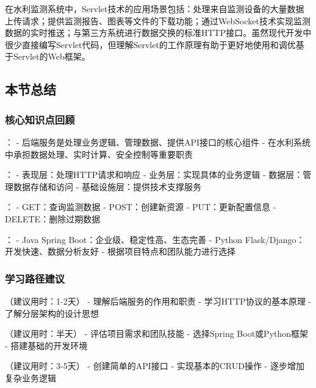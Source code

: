 在水利监测系统中，Servlet技术的应用场景包括：处理来自监测设备的大量数据上传请求；提供监测报告、图表等文件的下载功能；通过WebSocket技术实现监测数据的实时推送；与第三方系统进行数据交换的标准HTTP接口。虽然现代开发中很少直接编写Servlet代码，但理解Servlet的工作原理有助于更好地使用和调优基于Servlet的Web框架。

\hypertarget{ux672cux8282ux603bux7ed3}{%
\subsection{本节总结}\label{ux672cux8282ux603bux7ed3}}

\hypertarget{ux6838ux5fc3ux77e5ux8bc6ux70b9ux56deux987e}{%
\subsubsection{核心知识点回顾}\label{ux6838ux5fc3ux77e5ux8bc6ux70b9ux56deux987e}}

： - 后端服务是处理业务逻辑、管理数据、提供API接口的核心组件 - 在水利系统中承担数据处理、实时计算、安全控制等重要职责

： - 表现层：处理HTTP请求和响应 - 业务层：实现具体的业务逻辑 - 数据层：管理数据存储和访问 - 基础设施层：提供技术支撑服务

： - GET：查询监测数据 - POST：创建新资源 - PUT：更新配置信息 - DELETE：删除过期数据

： - Java Spring Boot：企业级、稳定性高、生态完善 - Python Flask/Django：开发快速、数据分析友好 - 根据项目特点和团队能力进行选择

\hypertarget{ux5b66ux4e60ux8defux5f84ux5efaux8bae-1}{%
\subsubsection{学习路径建议}\label{ux5b66ux4e60ux8defux5f84ux5efaux8bae-1}}

（建议用时：1-2天） - 理解后端服务的作用和职责 - 学习HTTP协议的基本原理 - 了解分层架构的设计思想

（建议用时：半天） - 评估项目需求和团队技能 - 选择Spring Boot或Python框架 - 搭建基础的开发环境

（建议用时：3-5天） - 创建简单的API接口 - 实现基本的CRUD操作 - 逐步增加复杂业务逻辑

